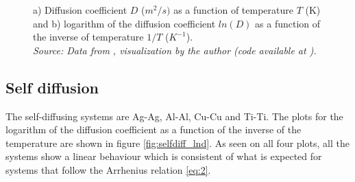 \begin{figure}[H]
 \centering
 \captionsetup{justification=centering}
 \caption{a) Diffusion coefficient $D$ ($m^2/s)$ as a function of temperature $T$ (K) and b) logarithm of the diffusion coefficient $ln(D)$ as a function of the inverse of temperature $1/T$ ($K^{-1}$). \\
 \textit{Source: Data from \citep{kakusan}, visualization by the author (code available at \citep{mygit}).}}
 \label{fig:diffusion}
\end{figure}

\subsection{Self diffusion}

The self-diffusing systems are Ag-Ag, Al-Al, Cu-Cu and Ti-Ti. The plots for the logarithm of the diffusion coefficient as a function of the inverse of the temperature are shown in figure \ref{fig:selfdiff_lnd}. As seen on all four plots, all the systems show a linear behaviour which is consistent of what is expected for systems that follow the Arrhenius relation \eqref{eq:2}. 

